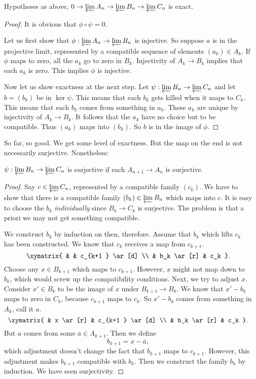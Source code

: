 \begin{proposition} 
Hypotheses as above, $ 0 \to \varprojlim A_n \to \varprojlim B_n \to
\varprojlim C_n$ is exact. 
\end{proposition} 
\begin{proof} 
It is obvious that $\phi \circ \psi = 0$. 

Let us first show that $\phi: \varprojlim A_n \to \varprojlim B_n$ is
injective. So suppose $a $ is in the projective limit, represented by a
compatible sequence of elements $(a_k )\in A_k$. If $\phi$ maps to zero, all
the $a_k$ go to zero in $B_k$. Injectivity of $A_k \to B_k$ implies that each
$a_k$ is zero. This implies $\phi$ is injective. 

Now let us show exactness at the next step. Let $\psi:  \varprojlim B_n \to
\varprojlim C_n$ and let $b = (b_k)$ be in $\ker \psi$. This means that each
$b_k$ gets killed when it maps to $C_k$. This means that each $b_k$ comes from
something in $a_k$. These $a_k$ are unique by injectivity of $A_k \to B_k$. It
follows that the $a_k$ have no choice but to be compatible. Thus $(a_k)$ maps
into $(b_k)$. So $b$ is in the image of $\phi$. 
\end{proof} 

So far, so good. We get some level of exactness. But the map on the end is not
necessarily surjective. Nonetheless:

\begin{proposition} 
$\psi: \varprojlim B_n \to \varprojlim C_n$ is surjective if each $A_{n+1} \to
A_n$ is surjective.
\end{proposition} 
\begin{proof} 
Say $c \in \varprojlim C_n$, represented by a compatible family $(c_k)$. We
have to show that there is a compatible family $(b_k) \in \varprojlim B_n$
which maps into $c$. It is easy to choose the $b_k$ \emph{individually} since
$B_k \to C_k$ is surjective. The problem is that a priori we may not get
something compatible.

We construct $b_k$ by induction on then, therefore. Assume that $b_k$ which
lifts $c_k$ has been constructed. 
We know that $c_k$ receives  a map from $c_{k+1}$. 
\[ \xymatrix{
& & c_{k+1 } \ar[d] \\
& b_k \ar[r] &  c_k
}.\]
Choose any $x \in B_{k+1}$ which maps to $c_{k+1}$. However, $x$ might not map
down to $b_k$, which would screw up the compatibility conditions. Next, we try to adjust $x$. 
Consider $x' \in B_k$ to be the image of $x$ under $B_{k+1} \to B_k$. We know
that $x' - b_k$ maps to zero in $C_k$, because $c_{k+1}$ maps to $c_k$.
So $x' - b_k$ comes from something in $A_k$, call it $a$. 
\[ \xymatrix{
& x \ar[r] &  c_{k+1 } \ar[d] \\
& b_k \ar[r] &  c_k
}.\]
But $a$ comes from some $\overline{a} \in A_{k+1}$. Then we define
\[ b_{k+1} = x - \overline{a},  \]
which adjustment doesn't change the fact that $b_{k+1}$ maps to $c_{k+1}$.
However, this adjustment makes $b_{k+1}$ compatible with $b_k$. Then we
construct the family $b_k$ by induction. We have seen surjectivity.
\end{proof} 

